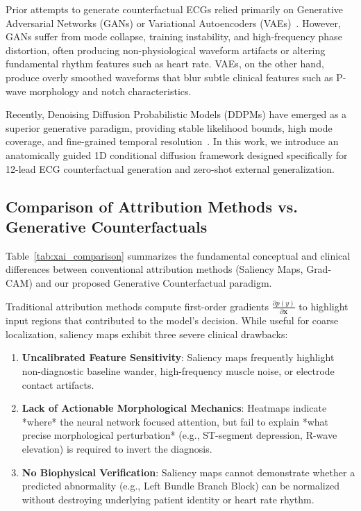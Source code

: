 \documentclass[12pt]{elsarticle}
\begin{document}
Prior attempts to generate counterfactual ECGs relied primarily on Generative Adversarial Networks (GANs) or Variational Autoencoders (VAEs)~\cite{korkmaz2021deep, dempsey2022generative}. However, GANs suffer from mode collapse, training instability, and high-frequency phase distortion, often producing non-physiological waveform artifacts or altering fundamental rhythm features such as heart rate. VAEs, on the other hand, produce overly smoothed waveforms that blur subtle clinical features such as P-wave morphology and notch characteristics.

Recently, Denoising Diffusion Probabilistic Models (DDPMs) have emerged as a superior generative paradigm, providing stable likelihood bounds, high mode coverage, and fine-grained temporal resolution~\cite{ho2020denoising, dhariwal2021diffusion}. In this work, we introduce an anatomically guided 1D conditional diffusion framework designed specifically for 12-lead ECG counterfactual generation and zero-shot external generalization.

\subsection{Comparison of Attribution Methods vs. Generative Counterfactuals}
Table~\ref{tab:xai_comparison} summarizes the fundamental conceptual and clinical differences between conventional attribution methods (Saliency Maps, Grad-CAM) and our proposed Generative Counterfactual paradigm.

Traditional attribution methods compute first-order gradients $\frac{\partial p(y)}{\partial \mathbf{x}}$ to highlight input regions that contributed to the model's decision. While useful for coarse localization, saliency maps exhibit three severe clinical drawbacks:
\begin{enumerate}
    \item \textbf{Uncalibrated Feature Sensitivity}: Saliency maps frequently highlight non-diagnostic baseline wander, high-frequency muscle noise, or electrode contact artifacts.
    \item \textbf{Lack of Actionable Morphological Mechanics}: Heatmaps indicate *where* the neural network focused attention, but fail to explain *what precise morphological perturbation* (e.g., ST-segment depression, R-wave elevation) is required to invert the diagnosis.
    \item \textbf{No Biophysical Verification}: Saliency maps cannot demonstrate whether a predicted abnormality (e.g., Left Bundle Branch Block) can be normalized without destroying underlying patient identity or heart rate rhythm.
\end{enumerate}
\end{document}
